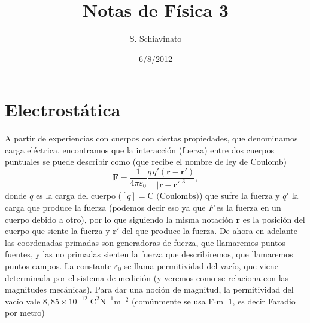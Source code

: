 \documentclass[11pt,a4paper]{article}
\title{Notas de Física 3}
\author{S. Schiavinato}
\date{6/8/2012}
\numberwithin{equation}{section}
\begin{document}
\maketitle
\tableofcontents
\section{Electrostática}
\label{sec:e_estatica}
A partir de experiencias con cuerpos con ciertas propiedades, que denominamos carga eléctrica, encontramos que la interacción (fuerza) entre dos cuerpos puntuales se puede describir como (que recibe el nombre de ley de Coulomb)
\begin{equation}
    \textbf{F} = \frac{1}{4\pi\varepsilon_0}\frac{q\,q'(\textbf{r}-\textbf{r}')}{|\textbf{r}-\textbf{r}'|^{3}},
    \label{eq:coulomb}
\end{equation}
donde $q$ es la carga del cuerpo ($[q] = \text{C (Coulombs)}$) que sufre la fuerza y $q'$ la carga que produce la fuerza (podemos decir eso ya que $F$ es la fuerza en un cuerpo debido a otro), por lo que siguiendo la misma notación $\textbf{r}$ es la posición del cuerpo que siente la fuerza y $\textbf{r}'$ del que produce la fuerza.  De ahora en adelante las coordenadas primadas son generadoras de fuerza, que llamaremos puntos fuentes, y las no primadas sienten la fuerza que describiremos, que llamaremos puntos campos. La constante $\varepsilon_0$ se llama permitividad del vacío, que viene determinada por el sistema de medición (y veremos como se relaciona con las magnitudes mecánicas). Para dar una noción de magnitud, la permitividad del vacío vale $8,85\times10^{-12} \; \text{C}^2\text{N}^{-1} \text{m}^{-2}$ (comúnmente se usa F$\cdot$m$^-1$, es decir Faradio por metro)
\end{document}
